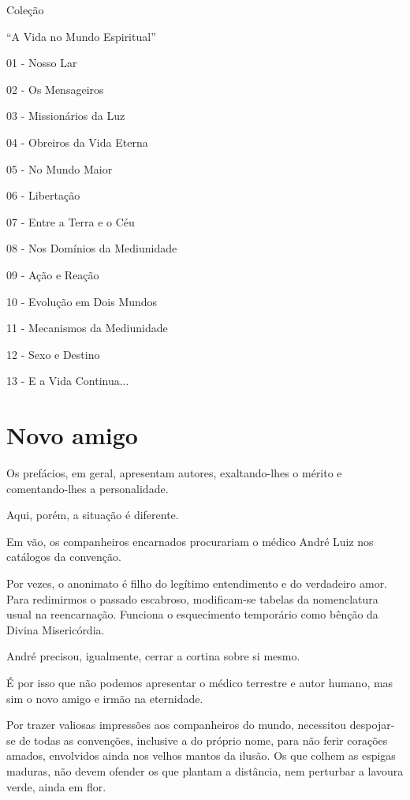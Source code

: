 \documentclass[portuguese,12pt,a4paper]{scrbook}
\begin{document}
	
	
		
	Coleção
	
	“A Vida no Mundo Espiritual”
	
	01 - Nosso Lar
	
	02 - Os Mensageiros
	
	03 - Missionários da Luz
	
	04 - Obreiros da Vida Eterna
	
	05 - No Mundo Maior
	
	06 - Libertação
	
	07 - Entre a Terra e o Céu
	
	08 - Nos Domínios da Mediunidade
	
	09 - Ação e Reação
	
	10 - Evolução em Dois Mundos
	
	11 - Mecanismos da Mediunidade
	
	12 - Sexo e Destino
	
	13 - E a Vida Continua...
	
	\cleardoublepage

	\tableofcontents
	\clearpage

	\cleardoublepage
	\chapter*{Novo amigo}
	Os prefácios, em geral, apresentam autores, exaltando-lhes o mérito e comentando-lhes a personalidade.
	
	Aqui, porém, a situação é diferente.
	
	Em vão, os companheiros encarnados procurariam o médico André Luiz nos catálogos da convenção.
	
	Por vezes, o anonimato é filho do legítimo entendimento e do verdadeiro amor. Para redimirmos o passado escabroso, modificam-se tabelas da nomenclatura usual na reencarnação. Funciona o esquecimento temporário como bênção da Divina Misericórdia.
	
	André precisou, igualmente, cerrar a cortina sobre si mesmo.
	
	É por isso que não podemos apresentar o médico terrestre e autor humano, mas sim o novo amigo e irmão na eternidade.
	
	Por trazer valiosas impressões aos companheiros do mundo, necessitou despojar-se de todas as convenções, inclusive a do próprio nome, para não ferir corações amados, envolvidos ainda nos velhos mantos da ilusão. Os que colhem as espigas maduras, não devem ofender os que plantam a distância, nem perturbar a lavoura verde, ainda em flor.
	
\end{document}
